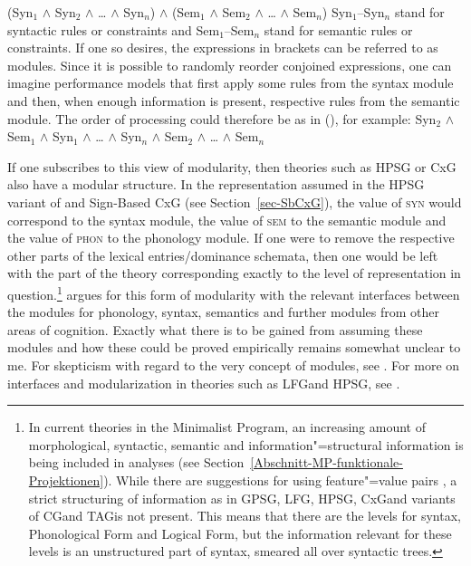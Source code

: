 \ea
(Syn$_1$ $\wedge$ Syn$_2$ $\wedge$ \ldots{} $\wedge$ Syn$_n$) $\wedge$ (Sem$_1$ $\wedge$ Sem$_2$ $\wedge$ \ldots{} $\wedge$ Sem$_n$)
\z
Syn$_1$--Syn$_n$ stand for syntactic rules or constraints and Sem$_1$--Sem$_n$ stand for semantic rules or constraints.
If one so desires, the expressions in brackets can be referred to as modules. Since it is possible
to randomly reorder conjoined expressions, one can imagine performance models that first apply some
rules from the syntax module and then, when enough information is present, respective rules from the
semantic module. The order of processing could therefore be as in (), for example: 
\ea
Syn$_2$ $\wedge$ Sem$_1$ $\wedge$ Syn$_1$ $\wedge$ \ldots{} $\wedge$ Syn$_n$ $\wedge$ Sem$_2$ $\wedge$ \ldots{} $\wedge$ Sem$_n$
\z

\noindent
If one subscribes to this view of modularity, then theories such as HPSG or CxG also have a modular structure.
In the representation assumed in the HPSG variant of \citet{ps} and Sign-Based CxG (see Section~\ref{sec-SbCxG}),
the value of \textsc{syn} would correspond to the syntax module, the value of \textsc{sem} to the semantic module and the value of \textsc{phon}  to the phonology module. If one were to
remove the respective other parts of the lexical entries/dominance schemata, then one would
 be left with the part of the theory corresponding exactly to the level of representation in question.\footnote{%
  In current theories in the Minimalist Program, an increasing amount of morphological, syntactic, semantic and 
  information"=structural information is being included in analyses (see Section~\ref{Abschnitt-MP-funktionale-Projektionen}).
  While there are suggestions for using feature"=value pairs \citep[--291]{SE2002a}, a strict structuring of information
  as in GPSG\indexgpsg, LFG\indexlfg, HPSG\indexhpsg, CxG\indexcxg and variants of
  CG\indexcg and TAG\indextag is not present. This means that there are the levels for syntax, Phonological Form and Logical Form,
  but the information relevant for these levels is an unstructured part of syntax, smeared all over
  syntactic trees.
} 
 argues for this form of modularity with the relevant interfaces between the modules for phonology, syntax, semantics and further modules from other areas of cognition. 
Exactly what there is to be gained from assuming these modules and how these could be proved empirically remains somewhat unclear to me. For skepticism with regard to the very concept of modules, see
. For more on interfaces and modularization in theories such as LFG\indexlfg and HPSG\indexhpsg, see .

